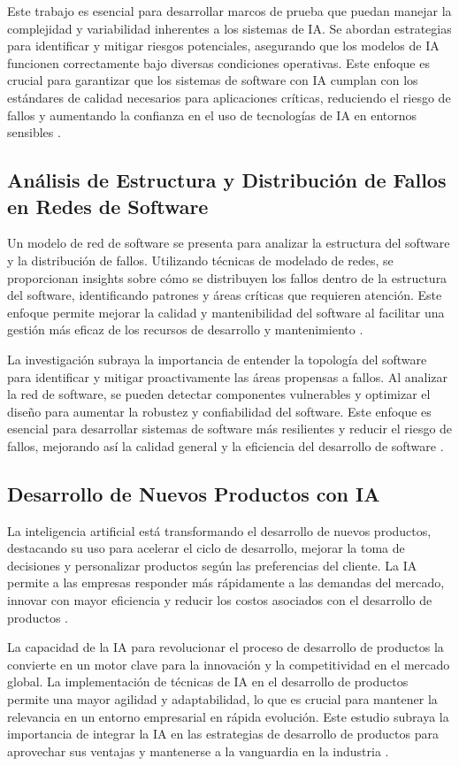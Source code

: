 Este trabajo es esencial para desarrollar marcos de prueba que puedan manejar la complejidad y variabilidad inherentes a los sistemas de IA. Se abordan estrategias para identificar y mitigar riesgos potenciales, asegurando que los modelos de IA funcionen correctamente bajo diversas condiciones operativas. Este enfoque es crucial para garantizar que los sistemas de software con IA cumplan con los estándares de calidad necesarios para aplicaciones críticas, reduciendo el riesgo de fallos y aumentando la confianza en el uso de tecnologías de IA en entornos sensibles \cite{Tao2019}.

\subsection{Análisis de Estructura y Distribución de Fallos en Redes de Software}

Un modelo de red de software se presenta para analizar la estructura del software y la distribución de fallos. Utilizando técnicas de modelado de redes, se proporcionan insights sobre cómo se distribuyen los fallos dentro de la estructura del software, identificando patrones y áreas críticas que requieren atención. Este enfoque permite mejorar la calidad y mantenibilidad del software al facilitar una gestión más eficaz de los recursos de desarrollo y mantenimiento \cite{Ai2019}.

La investigación subraya la importancia de entender la topología del software para identificar y mitigar proactivamente las áreas propensas a fallos. Al analizar la red de software, se pueden detectar componentes vulnerables y optimizar el diseño para aumentar la robustez y confiabilidad del software. Este enfoque es esencial para desarrollar sistemas de software más resilientes y reducir el riesgo de fallos, mejorando así la calidad general y la eficiencia del desarrollo de software \cite{Ai2019}.

\subsection{Desarrollo de Nuevos Productos con IA}

La inteligencia artificial está transformando el desarrollo de nuevos productos, destacando su uso para acelerar el ciclo de desarrollo, mejorar la toma de decisiones y personalizar productos según las preferencias del cliente. La IA permite a las empresas responder más rápidamente a las demandas del mercado, innovar con mayor eficiencia y reducir los costos asociados con el desarrollo de productos \cite{Cooper2024}.

La capacidad de la IA para revolucionar el proceso de desarrollo de productos la convierte en un motor clave para la innovación y la competitividad en el mercado global. La implementación de técnicas de IA en el desarrollo de productos permite una mayor agilidad y adaptabilidad, lo que es crucial para mantener la relevancia en un entorno empresarial en rápida evolución. Este estudio subraya la importancia de integrar la IA en las estrategias de desarrollo de productos para aprovechar sus ventajas y mantenerse a la vanguardia en la industria \cite{Cooper2024}.

